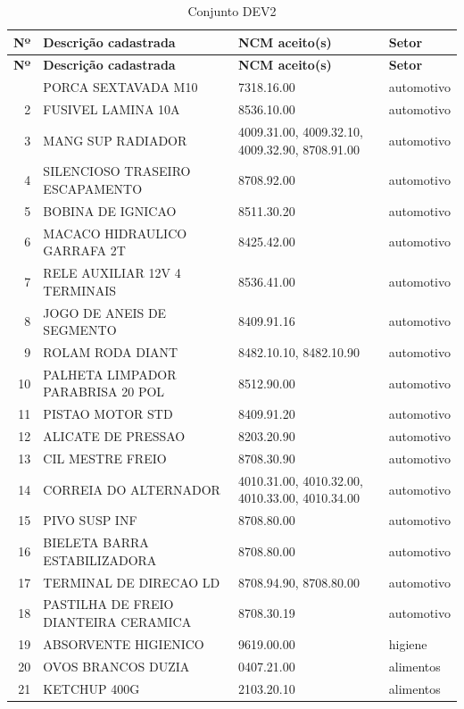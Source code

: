 \begin{apendicesenv}
\begin{center}
\small
\begin{longtable}{r p{6.6cm} p{4.4cm} p{2.6cm}}
\caption{Conjunto DEV2}\label{tab:ap_dev2} \\
\hline
\textbf{Nº} & \textbf{Descrição cadastrada} & \textbf{NCM aceito(s)} & \textbf{Setor} \\
\hline
\endfirsthead
\hline
\textbf{Nº} & \textbf{Descrição cadastrada} & \textbf{NCM aceito(s)} & \textbf{Setor} \\
\hline
\endhead
\hline
\endfoot
1 & PORCA SEXTAVADA M10 & 7318.16.00 & automotivo \\
2 & FUSIVEL LAMINA 10A & 8536.10.00 & automotivo \\
3 & MANG SUP RADIADOR & 4009.31.00, 4009.32.10, 4009.32.90, 8708.91.00 & automotivo \\
4 & SILENCIOSO TRASEIRO ESCAPAMENTO & 8708.92.00 & automotivo \\
5 & BOBINA DE IGNICAO & 8511.30.20 & automotivo \\
6 & MACACO HIDRAULICO GARRAFA 2T & 8425.42.00 & automotivo \\
7 & RELE AUXILIAR 12V 4 TERMINAIS & 8536.41.00 & automotivo \\
8 & JOGO DE ANEIS DE SEGMENTO & 8409.91.16 & automotivo \\
9 & ROLAM RODA DIANT & 8482.10.10, 8482.10.90 & automotivo \\
10 & PALHETA LIMPADOR PARABRISA 20 POL & 8512.90.00 & automotivo \\
11 & PISTAO MOTOR STD & 8409.91.20 & automotivo \\
12 & ALICATE DE PRESSAO & 8203.20.90 & automotivo \\
13 & CIL MESTRE FREIO & 8708.30.90 & automotivo \\
14 & CORREIA DO ALTERNADOR & 4010.31.00, 4010.32.00, 4010.33.00, 4010.34.00 & automotivo \\
15 & PIVO SUSP INF & 8708.80.00 & automotivo \\
16 & BIELETA BARRA ESTABILIZADORA & 8708.80.00 & automotivo \\
17 & TERMINAL DE DIRECAO LD & 8708.94.90, 8708.80.00 & automotivo \\
18 & PASTILHA DE FREIO DIANTEIRA CERAMICA & 8708.30.19 & automotivo \\
19 & ABSORVENTE HIGIENICO & 9619.00.00 & higiene \\
20 & OVOS BRANCOS DUZIA & 0407.21.00 & alimentos \\
21 & KETCHUP 400G & 2103.20.10 & alimentos \\

\end{longtable}
\end{center}
\end{apendicesenv}
